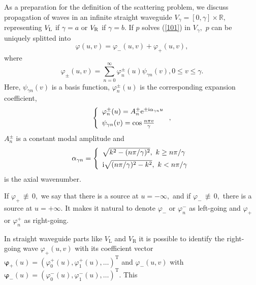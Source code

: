 \documentclass[numreferences]{kluwer}
\renewcommand{\phi}{\varphi}
\begin{document}
As a preparation for the definition of the scattering problem, we
discuss propagation of waves in an infinite straight waveguide
$V_{\gamma}=[0,\gamma]\times\mathbb{R},$ representing $V_{\rm L}$ if
$\gamma=a$ or $V_{\rm R}$ if $\gamma=b$. If $p$ solves (\ref{101}) in
$V_{\gamma},$ $p$ can be uniquely splitted into%
\begin{equation}
  \phi(u,v)=\phi_{-}(u,v)+\phi_{+}(u,v), \label{103}%
\end{equation}
where%
\begin{equation}\label{103.2}
  \phi_{\pm}(u,v)=\sum_{n=0}^{\infty}\phi_{n}^{\pm}(u)\psi
  _{\gamma n}(v),0\leq v\leq \gamma.
\end{equation}
Here, $\psi _{\gamma n}(v)$ is a basis function, $\phi_{n}^{\pm}(u)$
is the corresponding expansion coefficient,
\begin{equation}
  \left\{
    \begin{array}
      [c]{l}%
      \phi_{n}^{\pm}(u)=A_{n}^{\pm}\text{e}^{\pm\text{i}\alpha_{\gamma n}u}\\[1ex]%
      \psi
      _{\gamma n}(v)=\cos\frac{n\pi v}{\gamma}
    \end{array}
  \right.  , \label{103.4}%
\end{equation}
$A_{n}^{\pm}$ is a constant modal amplitude and
\begin{equation}
  \alpha_{\gamma n}=\left\{
    \begin{array}
      [c]{l}%
      \sqrt{k^{2}-(n\pi/\gamma)^{2}},\text{ }k\geq n\pi/\gamma\\[1ex]%
      \text{i}\sqrt{(n\pi/\gamma)^{2}-k^{2}},\text{ }k<n\pi/\gamma%
    \end{array}
  \right.   \label{106}%
\end{equation}
is the axial wavenumber.

If $\phi_{+}\,\nequiv\, 0,$ we say that there is a source at
$u=-\infty,$ and if $\phi_{-}\,\nequiv\, 0,$ there is a source at
$u=+\infty.$ It makes it natural to denote $\phi_{-}$ or
$\phi_{n}^{-}$ as left-going and $\phi_{+}$ or $\phi_{n}^{+}$ as
right-going.


In straight waveguide parts like $V_{\text{L}}$ and $V_{\text{R}}$ it
is possible to identify the right-going wave $ \phi_{+}(u,v)$ with its
coefficient vector $
\bm{\phi}_{+}(u)=(\phi_{0}^{+}(u),\phi_{1}^{+}(u),\ldots)^{\text{T}}$
and $ \phi_{-}(u,v)$ with $
\bm{\phi}_{-}(u)=(\phi_{0}^{-}(u),\phi_{1}^{-}(u),\ldots)^{\text{T}}$. This
\end{document}
